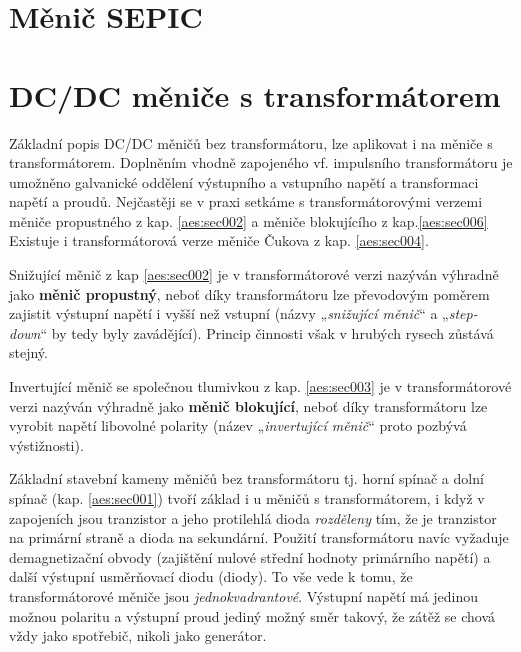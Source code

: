 {  \section{Měnič SEPIC}\label{aes:sec011}


  \section{DC/DC měniče s transformátorem}\label{aes:sec007}
    Základní popis DC/DC měničů bez transformátoru, lze aplikovat i na měniče s transformátorem. 
    Doplněním vhodně zapojeného vf. impulsního transformátoru je umožněno galvanické oddělení 
    výstupního a vstupního napětí a transformaci napětí a proudů. Nejčastěji se v praxi setkáme s 
    transformátorovými verzemi měniče propustného z kap. \ref{aes:sec002} a měniče 
    blokujícího z kap.\ref{aes:sec006} Existuje i transformátorová verze měniče Čukova z kap. 
    \ref{aes:sec004}.
  
    Snižující měnič z kap \ref{aes:sec002} je v transformátorové verzi nazýván výhradně jako
    \textbf{měnič propustný}, neboť díky transformátoru lze převodovým poměrem zajistit výstupní 
    napětí i vyšší než vstupní (názvy „\emph{snižující měnič}“ a „\emph{step-down}“ by tedy byly 
    zavádějící). Princip činnosti však v hrubých rysech zůstává stejný.
  
    Invertující měnič se společnou tlumivkou z kap. \ref{aes:sec003} je v transformátorové 
    verzi nazýván výhradně jako \textbf{měnič blokující}, neboť díky transformátoru lze vyrobit 
    napětí libovolné polarity (název „\emph{invertující měnič}“ proto pozbývá výstižnosti).
  
    Základní stavební kameny měničů bez transformátoru tj. horní spínač a dolní spínač (kap.
    \ref{aes:sec001}) tvoří základ i u měničů s transformátorem, i když v zapojeních 
    jsou tranzistor a jeho protilehlá dioda \emph{rozděleny} tím, že je tranzistor na primární 
    straně a dioda na sekundární. Použití transformátoru navíc vyžaduje demagnetizační obvody 
    (zajištění nulové střední hodnoty primárního napětí) a další výstupní usměrňovací diodu 
    (diody). To vše vede k tomu, že transformátorové měniče jsou \emph{jednokvadrantové}. Výstupní 
    napětí má jedinou možnou polaritu a výstupní proud jediný možný směr takový, že zátěž se chová 
    vždy jako spotřebič, nikoli jako generátor.

    

}
